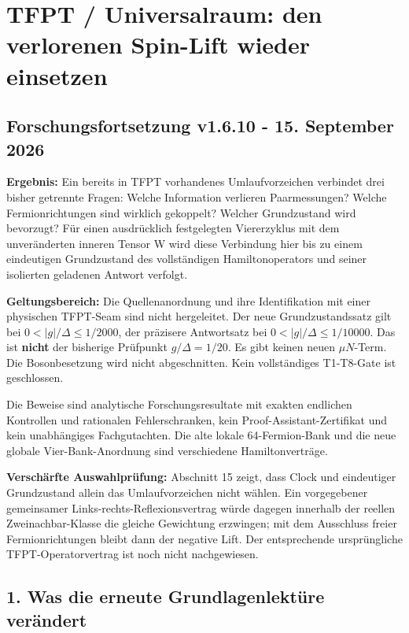 

{
\setcounter{tocdepth}{2}
\tableofcontents
\clearpage
}
\section{TFPT / Universalraum: den verlorenen Spin-Lift wieder
einsetzen}\label{tfpt-universalraum-den-verlorenen-spin-lift-wieder-einsetzen}

\subsection{Forschungsfortsetzung v1.6.10 - 15. September
2026}\label{forschungsfortsetzung-v1.6.10---15.-september-2026}

\textbf{Ergebnis:} Ein bereits in TFPT vorhandenes Umlaufvorzeichen
verbindet drei bisher getrennte Fragen: Welche Information verlieren
Paarmessungen? Welche Fermionrichtungen sind wirklich gekoppelt? Welcher
Grundzustand wird bevorzugt? Für einen ausdrücklich festgelegten
Viererzyklus mit dem unveränderten inneren Tensor W wird diese
Verbindung hier bis zu einem eindeutigen Grundzustand des vollständigen
Hamiltonoperators und seiner isolierten geladenen Antwort verfolgt.

\textbf{Geltungsbereich:} Die Quellenanordnung und ihre Identifikation
mit einer physischen TFPT-Seam sind nicht hergeleitet. Der neue
Grundzustandssatz gilt bei \(0<|g|/\Delta\le1/2000\), der präzisere
Antwortsatz bei \(0<|g|/\Delta\le1/10000\). Das ist \textbf{nicht} der
bisherige Prüfpunkt \(g/\Delta=1/20\). Es gibt keinen neuen
\(\mu N\)-Term. Die Bosonbesetzung wird nicht abgeschnitten. Kein
vollständiges T1-T8-Gate ist geschlossen.

Die Beweise sind analytische Forschungsresultate mit exakten endlichen
Kontrollen und rationalen Fehlerschranken, kein
Proof-Assistant-Zertifikat und kein unabhängiges Fachgutachten. Die alte
lokale 64-Fermion-Bank und die neue globale Vier-Bank-Anordnung sind
verschiedene Hamiltonverträge.

\textbf{Verschärfte Auswahlprüfung:} Abschnitt 15 zeigt, dass Clock und
eindeutiger Grundzustand allein das Umlaufvorzeichen nicht wählen. Ein
vorgegebener gemeinsamer Links-rechts-Reflexionsvertrag würde dagegen
innerhalb der reellen Zweinachbar-Klasse die gleiche Gewichtung
erzwingen; mit dem Ausschluss freier Fermionrichtungen bleibt dann der
negative Lift. Der entsprechende ursprüngliche TFPT-Operatorvertrag ist
noch nicht nachgewiesen.

\subsection{1. Was die erneute Grundlagenlektüre
verändert}\label{was-die-erneute-grundlagenlektuxfcre-veruxe4ndert}

